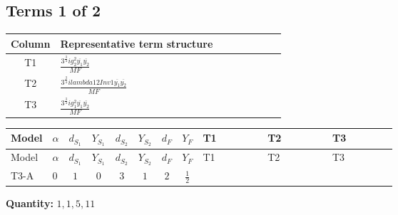 \documentclass[8pt]{article}
\begin{document}
\begin{landscape}
\subsection*{Terms 1 of 2}
\begin{center}
\begin{tabular}{@{}c >{\raggedright\arraybackslash}p{0.82\linewidth}@{}}
\toprule
Column & Representative term structure \\
\midrule
T1 & \(\displaystyle \frac{3^{\frac{3}{4}} i g_{2}^{2} \overline{y_{1}} \overline{y_{2}}}{MF}\) \\
\midrule
T2 & \(\displaystyle \frac{3^{\frac{3}{4}} i lambda12Inv1 \overline{y_{1}} \overline{y_{2}}}{MF}\) \\
\midrule
T3 & \(\displaystyle \frac{3^{\frac{3}{4}} i g_{1}^{2} \overline{y_{1}} \overline{y_{2}}}{MF}\) \\
\midrule
\bottomrule
\end{tabular}
\end{center}
\smallskip
\tiny
\begin{longtable}{@{}llcccccc >{\raggedright\arraybackslash}p{0.21\linewidth} >{\raggedright\arraybackslash}p{0.21\linewidth} >{\raggedright\arraybackslash}p{0.21\linewidth}@{}}
\toprule
Model & $\alpha$ & $d_{S_1}$ & $Y_{S_1}$ & $d_{S_2}$ & $Y_{S_2}$ & $d_F$ & $Y_F$ & T1 & T2 & T3 \\
\midrule
\endfirsthead
\toprule
Model & $\alpha$ & $d_{S_1}$ & $Y_{S_1}$ & $d_{S_2}$ & $Y_{S_2}$ & $d_F$ & $Y_F$ & T1 & T2 & T3 \\
\midrule
\endhead
T3-A & $0$ & $1$ & $0$ & $3$ & $1$ & $2$ & $\frac{1}{2}$ & \scriptsize\adjustbox{max width=\linewidth}{$\begin{gathered} - \frac{17 \cdot 3^{\frac{3}{4}} i g_{2}^{2} \overline{y_{1}} \overline{y_{2}}}{24 MF}\end{gathered}$} & \scriptsize\adjustbox{max width=\linewidth}{$\begin{gathered} - \frac{3^{\frac{3}{4}} i lambda12Inv1 \overline{y_{1}} \overline{y_{2}}}{6 MF}\end{gathered}$} & \scriptsize\adjustbox{max width=\linewidth}{$\begin{gathered} - \frac{3^{\frac{3}{4}} i g_{1}^{2} \overline{y_{1}} \overline{y_{2}}}{8 MF}\end{gathered}$} \\
\midrule
\bottomrule
\end{longtable}
\clearpage
\noindent\textbf{Quantity: }$\mathrm{1,1,5,11}$\par\smallskip

\end{landscape}
\end{document}
